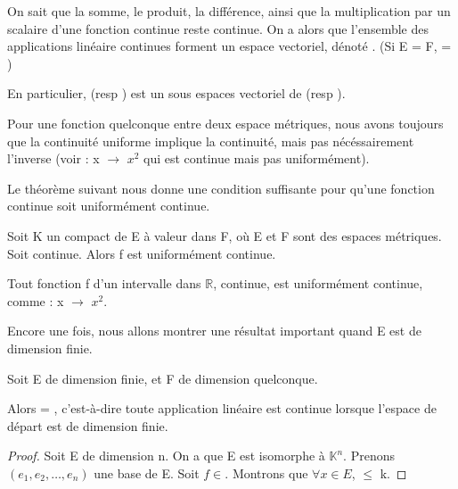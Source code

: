 On sait que la somme, le produit, la différence, ainsi que la multiplication par
un scalaire d'une fonction continue reste continue. On a alors que l'ensemble
des applications linéaire continues forment un espace vectoriel, dénoté
. (Si E = F,  =
)

En particulier,  (resp ) est un sous
espaces vectoriel de  (resp ).

\begin{remarque}
	Pour une fonction quelconque entre deux espace métriques, nous avons
	toujours que la continuité uniforme implique la continuité, mais pas
	nécéssairement l'inverse (voir  : x $\rightarrow$ $x^2$ qui est continue mais pas uniformément).
\end{remarque}

Le théorème suivant nous donne une condition suffisante pour qu'une fonction
continue soit uniformément continue.

\begin{theorem} [Heine]
	Soit K un compact de E à valeur dans F, où E et F sont des espaces
	métriques. Soit  continue. Alors f est uniformément
	continue.
	\label{Heine}
\end{theorem}

\begin{exemple}
	Tout fonction f d'un intervalle  dans $\mathbb{R}$, continue, est
	uniformément continue, comme
	 : x $\rightarrow$ $x^2$.
\end{exemple}

Encore une fois, nous allons montrer une résultat important quand E est de
dimension finie.

\begin{proposition}
	Soit E de dimension finie, et F de dimension quelconque.
	
	Alors  = , c'est-à-dire toute
	application linéaire est continue lorsque l'espace de départ est de
	dimension finie.
\end{proposition}

\begin{proof}
	Soit E de dimension n.
	On a que E est isomorphe à $\mathbb{K}^{n}$. Prenons $(e_{1}, e_{2}, \ldots,
	e_{n})$ une base de E.
	Soit $f \in $. Montrons que $\forall x \in E$,
	 $\leq$ k.
\end{proof}

